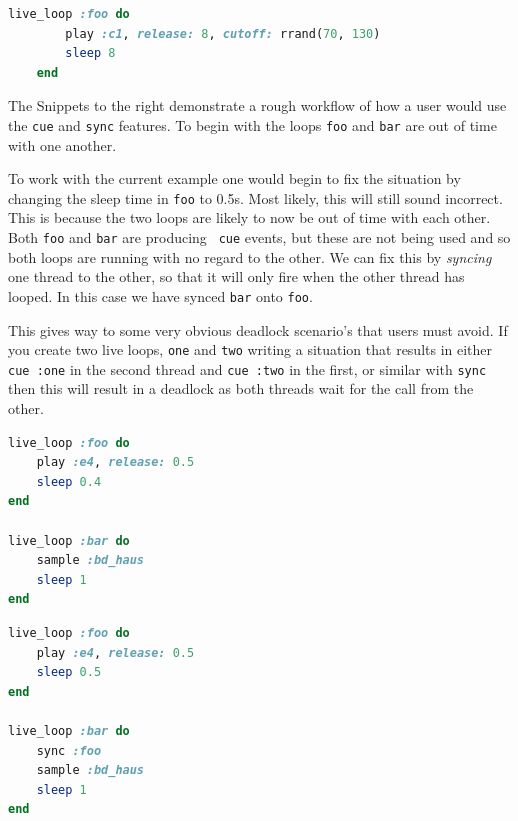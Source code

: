 \documentclass[11pt]{scrartcl}
\begin{document}
\begin{minipage}{\textwidth}
	\begin{lstlisting}[language = ruby]
    live_loop :foo do
        play :c1, release: 8, cutoff: rrand(70, 130)
        sleep 8
    end
	\end{lstlisting}
\end{minipage}

\clearpage
\begin{multicols}{2}
The Snippets to the right demonstrate a rough workflow of how a user would use 
the \texttt{cue} and \texttt{sync} features. To begin with the loops 
\texttt{foo} and \texttt{bar} are out of time with one another.

To work with the current example one would begin to fix the situation by 
changing the sleep time in \texttt{foo} to 0.5s. Most likely, this will still 
sound incorrect. This is because the two loops are likely to now be out of 
time with each other. Both \texttt{foo} and \texttt{bar} are producing \texttt{
cue} events, but these are not being used and so both loops are running with 
no regard to the other. We can fix this by \emph{syncing} one thread to the 
other, so that it will only fire when the other thread has looped. In this 
case we have synced \texttt{bar} onto \texttt{foo}.

This gives way to some very obvious deadlock scenario's that users must avoid. 
If you create two live loops, \texttt{one} and \texttt{two} writing a 
situation that results in either \texttt{cue :one} in the second thread and 
\texttt{cue :two} in the first, or similar with \texttt{sync} then this will 
result in a deadlock as both threads wait for the call from the other.
	\begin{minipage}{0.5\textwidth}

		\begin{minipage}{\textwidth}
			\begin{lstlisting}[language = ruby]
live_loop :foo do
    play :e4, release: 0.5
    sleep 0.4
end

live_loop :bar do
    sample :bd_haus
    sleep 1
end
			\end{lstlisting}
		\end{minipage}

		\begin{minipage}{\textwidth}
			\begin{lstlisting}[language = ruby]
live_loop :foo do
    play :e4, release: 0.5
    sleep 0.5
end

live_loop :bar do
    sync :foo
    sample :bd_haus
    sleep 1
end
			\end{lstlisting}
		\end{minipage}

	\end{minipage}
\end{multicols}
\end{document}

